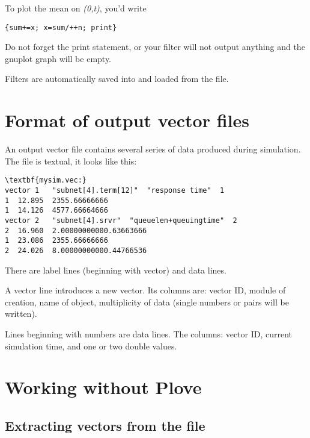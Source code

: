To plot the mean on \textit{(0,t)}, you'd write

\begin{verbatim}
{sum+=x; x=sum/++n; print}
\end{verbatim}

Do not forget the print statement, or your filter will not output
anything and the gnuplot graph will be empty.

Filters are automatically saved into and loaded from the 
file.





\section{Format of output vector files}

An output vector file contains several
series of data produced during simulation. The file is textual, it
looks like this:

\begin{Verbatim}[commandchars=\\\{\}]
\textbf{mysim.vec:}
vector 1   "subnet[4].term[12]"  "response time"  1
1  12.895  2355.66666666
1  14.126  4577.66664666
vector 2   "subnet[4].srvr"  "queuelen+queuingtime"  2
2  16.960  2.00000000000.63663666
1  23.086  2355.66666666
2  24.026  8.00000000000.44766536
\end{Verbatim}


There are label lines (beginning with vector) and data lines.

A vector line introduces a new vector. Its columns are: vector ID,
module of creation, name of  object, multiplicity
of data (single numbers or pairs will be written).

Lines beginning with numbers are data lines. The columns: vector
ID, current simulation time, and one or two double values.





\section{Working without Plove}

\subsection{Extracting vectors from the file}

